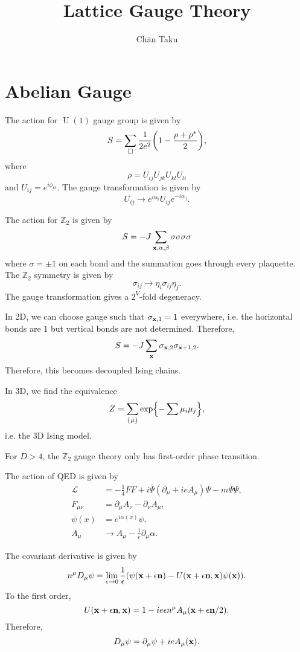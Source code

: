 \documentclass{article}
\title{Lattice Gauge Theory}
\author{Ch\=an Taku}
\begin{document}
\maketitle

\section{Abelian Gauge}

The action for $\operatorname{U}(1)$ gauge group is given by
\[ S = \sum_{\Box} \frac{1}{2e^2}\qty(1-\frac{\rho + \rho^*}{2}), \]
where
\[ \rho = U_{ij}U_{jk}U_{kl}U_{li} \]
and $U_{ij} = e^{i\phi_{kl}}$.
The gauge transformation is given by
\[ U_{ij} \rightarrow e^{i\alpha_i} U_{ij} e^{-i\alpha_j}. \]

\par
The action for $\mathbb{Z}_2$ is given by
\[ S = -J \sum_{\vb{x},\alpha,\beta} \sigma\sigma\sigma\sigma \]
where $\sigma = \pm 1$ on each bond and the summation goes through every plaquette.
The $\mathbb{Z}_2$ symmetry is given by
\[ \sigma_{ij} \rightarrow \eta_i \sigma_{ij} \eta_j. \]
The gauge transformation gives a $2^V$-fold degeneracy.

\par
In 2D, we can choose gauge such that $\sigma_{\vb{x},1} = 1$ everywhere, i.e. the horizontal bonds are $1$ but vertical bonds are not determined.
Therefore,
\[ S = -J \sum_{\vb{x}} \sigma_{\vb{x},2} \sigma_{\vb{x}+1,2}. \]
Therefore, this becomes decoupled Ising chains.

\par
In 3D, we find the equivalence
\[ Z = \sum_{\qty{\mu}} \exp{-\sum \mu_i \mu_j}, \]
i.e. the 3D Ising model.

\par
For $D>4$, the $\mathbb{Z}_2$ gauge theory only has first-order phase transition.

\par
The action of QED is given by
\begin{align*}
    \mathcal{L} &= -\frac{1}{4}FF + i\overline{\Psi}(\partial_\mu + ie A_\mu)\Psi - m\overline{\Psi}\Psi, \\
    F_{\mu\nu} &= \partial_\mu A_\nu - \partial_\nu A_\mu, \\
    \psi(x) &= e^{i\alpha(x)}\psi,\\
    A_\mu &\rightarrow A_\mu - \frac{1}{e}\partial_\mu \alpha.
\end{align*}

The covariant derivative is given by
\[ n^\mu D_\mu \psi = \lim_{\epsilon\rightarrow 0} \frac{1}{\epsilon}\qty(\psi(\vb{x} + \epsilon\vb{n}) - U(\vb{x}+\epsilon \vb{n},\vb{x})\psi(\vb{x})). \]
To the first order,
\[ U(\vb{x} + \epsilon \vb{n},\vb{x}) = 1 - ie\epsilon n^\mu A_\mu(\vb{x} + \epsilon \vb{n}/2). \]
Therefore,
\[ D_\mu \psi = \partial_\mu \psi + ie A_\mu(\vb{x}). \]
\end{document}
